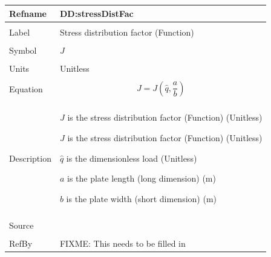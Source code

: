\documentclass[12pt]{article}
\begin{document}
\noindent \begin{minipage}{\textwidth}
\begin{tabular}{p{} p{}}
\toprule \textbf{Refname} & \textbf{DD:stressDistFac}
\label{DD:stressDistFac}
\\ \midrule \\
Label & Stress distribution factor (Function)
\\ \midrule \\
Symbol & $J$
\\ \midrule \\
Units & Unitless
\\ \midrule \\
Equation & \begin{dmath}
           J=J\left(\hat{q},\frac{a}{b}\right)
           \end{dmath}
\\ \midrule \\
Description & \begin{description}
              \item{$J$ is the stress distribution factor (Function) (Unitless)}
              \item{$J$ is the stress distribution factor (Function) (Unitless)}
              \item{$\hat{q}$ is the dimensionless load (Unitless)}
              \item{$a$ is the plate length (long dimension) (m)}
              \item{$b$ is the plate width (short dimension) (m)}
              \end{description}
\\ \midrule \\
Source & 
\\ \midrule \\
RefBy & FIXME: This needs to be filled in
\\ \bottomrule \end{tabular}
\end{minipage}\\
~\newline
\end{document}
